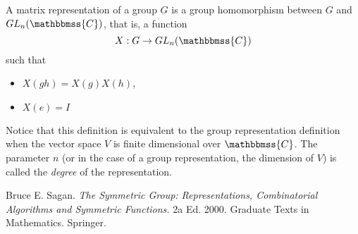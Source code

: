 \documentclass[12pt]{article}
\newcommand{\C}{\mathbbmss{C}}
\begin{document}
A matrix representation of a group $G$ is a group homomorphism between $G$ and $GL_n(\C)$, that is, a function
\[ X:G\to GL_n(\C)\]
such that 
\begin{itemize}
\item $X(gh)=X(g)X(h)$,
\item $X(e)=I$
\end{itemize}

Notice that this definition is equivalent to the group representation definition when the vector space $V$ is finite dimensional over $\C$. The parameter $n$ (or in the case of a group representation, the dimension of $V$) is called the \emph{degree} of the representation.


\begin{thebibliography}{9}
 Bruce E. Sagan. \emph{The Symmetric Group: Representations, Combinatorial Algorithms and Symmetric Functions.}  2a Ed. 2000. Graduate Texts in Mathematics. Springer.
\end{thebibliography}
\end{document}
